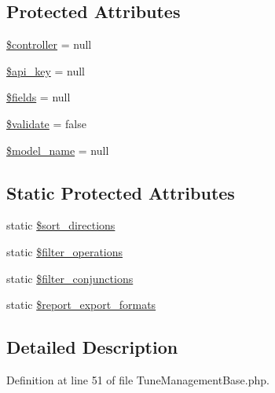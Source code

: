 \subsection*{Protected Attributes}
\begin{DoxyCompactItemize}
\item 
\hyperlink{classTune_1_1Management_1_1Endpoints_1_1TuneManagementBase_a8a73dbafcc91b04d7f1a7e2aaa9b486a}{\$controller} = null
\item 
\hyperlink{classTune_1_1Management_1_1Endpoints_1_1TuneManagementBase_ac53649b4bc72055e1d55e53e0b6f244e}{\$api\-\_\-key} = null
\item 
\hyperlink{classTune_1_1Management_1_1Endpoints_1_1TuneManagementBase_a215be5184c46eee7b2b3febaba85f91b}{\$fields} = null
\item 
\hyperlink{classTune_1_1Management_1_1Endpoints_1_1TuneManagementBase_a264eed27b0a1c963808fc7eab6da98bc}{\$validate} = false
\item 
\hyperlink{classTune_1_1Management_1_1Endpoints_1_1TuneManagementBase_aacb981c5880ac450685646f7172b6773}{\$model\-\_\-name} = null
\end{DoxyCompactItemize}
\subsection*{Static Protected Attributes}
\begin{DoxyCompactItemize}
\item 
static \hyperlink{classTune_1_1Management_1_1Endpoints_1_1TuneManagementBase_acff11dacff948faf210f3539c33ebd01}{\$sort\-\_\-directions}
\item 
static \hyperlink{classTune_1_1Management_1_1Endpoints_1_1TuneManagementBase_aa2978af944f1ef9318d7ee256c31b61f}{\$filter\-\_\-operations}
\item 
static \hyperlink{classTune_1_1Management_1_1Endpoints_1_1TuneManagementBase_ab9c6bdbfce92a888f93d1c712a400b44}{\$filter\-\_\-conjunctions}
\item 
static \hyperlink{classTune_1_1Management_1_1Endpoints_1_1TuneManagementBase_a99cfa7a88f10ac6ca74eccd832cf2dba}{\$report\-\_\-export\-\_\-formats}
\end{DoxyCompactItemize}


\subsection{Detailed Description}


Definition at line 51 of file Tune\-Management\-Base.\-php.



